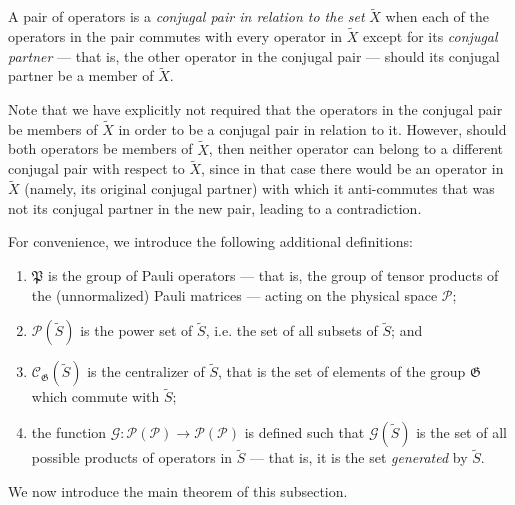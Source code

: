\documentclass[twocolumn,showpacs,preprintnumbers,amsmath,amssymb,nofootinbib,pra,floatfix]{revtex4}
\newenvironment{definition}[1][Definition]{\begin{trivlist}
\item[\hskip \labelsep {\bfseries #1}]}{\end{trivlist}}
\newcommand{\set}{\tilde}
\newcommand{\genfun}{\mathcal{G}}
\newcommand{\pauligroup}{\mathfrak{P}}
\newcommand{\powerset}{\mathcal{P}}
\newcommand{\centralizer}{\mathcal{C}}
\begin{document}
\begin{definition} A pair of operators is a \emph{conjugal pair in relation to the set} $\set X$ when each of the operators in the pair commutes with every operator in $\set X$ except for its \emph{conjugal partner} --- that is, the other operator in the conjugal pair --- should its conjugal partner be a member of $\set X$.
\label{conjugal-pair-definition}
\end{definition}

Note that we have explicitly not required that the operators in the conjugal pair be members of $\set X$ in order to be a conjugal pair in relation to it.  However, should both operators be members of $\set X$, then neither operator can belong to a different conjugal pair with respect to $\set X$, since in that case there would be an operator in $\set X$ (namely, its original conjugal partner) with which it anti-commutes that was not its conjugal partner in the new pair, leading to a contradiction.

For convenience, we introduce the following additional definitions:

\begin{definition}

\begin{enumerate}
\item $\pauligroup$ is the group of Pauli operators --- that is, the group of tensor products of the (unnormalized) Pauli matrices --- acting on the physical space $\mathscr{P}$;
\item $\powerset(\set S)$ is the power set of $\set S$, i.e. the set of all subsets of $\set S$; and
\item $\centralizer_\mathfrak{G}(\set S)$ is the centralizer of $\set S$, that is the set of elements of the group $\mathfrak{G}$ which commute with $\set S$;
\item the function $\genfun:\powerset(\mathscr{P})\to\powerset(\mathscr{P})$ is defined such that $\genfun(\set S)$ is the set of all possible products of operators in $\set S$ --- that is, it is the set \emph{generated} by $\set S$.
\end{enumerate}

\end{definition}

We now introduce the main theorem of this subsection.
\end{document}
